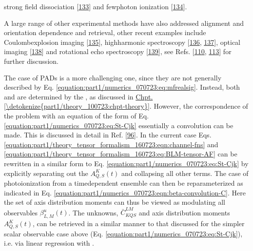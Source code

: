 \documentclass[letterpaper,table,10pt,english]{jupyterBook}
\begin{document}
strong field dissociation {[}\hyperlink{cite.backmatter/bibliography:id998}{133}{]} and few\sphinxhyphen{}photon ionization {[}\hyperlink{cite.backmatter/bibliography:id997}{134}{]}.%
\begin{footnote}[2]\sphinxAtStartFootnote
A large range of other experimental methods have also addressed alignment and orientation dependence and retrieval, other recent examples include Coulomb\sphinxhyphen{}explosion imaging {[}\hyperlink{cite.backmatter/bibliography:id937}{135}{]}, high\sphinxhyphen{}harmonic spectroscopy {[}\hyperlink{cite.backmatter/bibliography:id645}{136}, \hyperlink{cite.backmatter/bibliography:id646}{137}{]}, optical imaging {[}\hyperlink{cite.backmatter/bibliography:id759}{138}{]} and rotational echo spectroscopy {[}\hyperlink{cite.backmatter/bibliography:id951}{139}{]}, see Refs. {[}\hyperlink{cite.backmatter/bibliography:id727}{110}, \hyperlink{cite.backmatter/bibliography:id834}{113}{]} for further discussion.
%
\end{footnote}

\sphinxAtStartPar
The case of PADs is a more challenging one, since they are not generally described by Eq. \eqref{equation:part1/numerics_070723:eq:mfrealsig}. Instead, both {\hyperref[\detokenize{backmatter/glossary:term-AF}]{}} and {\hyperref[\detokenize{backmatter/glossary:term-MF}]{}} are determined by the {\hyperref[\detokenize{backmatter/glossary:term-radial-matrix-elements}]{}}, as discussed in \hyperref[\detokenize{part1/theory_100723:chpt-theory}]{Chpt.\@ \ref{\detokenize{part1/theory_100723:chpt-theory}}}. However, the correspondence of the problem with an equation of the form of Eq. \eqref{equation:part1/numerics_070723:eq:St-Cjk} \sphinxhyphen{} essentially a convolution \sphinxhyphen{} can be made. This is discussed in detail in Ref. {[}\hyperlink{cite.backmatter/bibliography:id935}{96}{]}. In the current case Eqs. \eqref{equation:part1/theory_tensor_formalism_160723:eqn:channel-fns} and \eqref{equation:part1/theory_tensor_formalism_160723:eq:BLM-tensor-AF} can be rewritten in a similar form to Eq. \eqref{equation:part1/numerics_070723:eq:St-Cjk} by explicitly separating out the {\hyperref[\detokenize{backmatter/glossary:term-ADMs}]{}} \(A_{Q,S}^{K}(t)\) and collapsing all other terms. The case of photoionization from a time\sphinxhyphen{}dependent ensemble can then be reparameterized as indicated in Eq. \eqref{equation:part1/numerics_070723:eqn:beta-convolution-C}. Here the set of axis distribution moments can thus be viewed as modulating all observables \(\beta_{L,M}^{u}(t)\). The unknowns, \(\bar{C}_{KQS}^{LM}\) and axis distribution moments \(A_{Q,S}^{K}(t)\), can be retrieved in a similar manner to that discussed for the simpler scalar observable case above (Eq. \eqref{equation:part1/numerics_070723:eq:St-Cjk}), i.e. via linear regression with {\hyperref[\detokenize{backmatter/glossary:term-RWP}]{}}.
\end{document}
